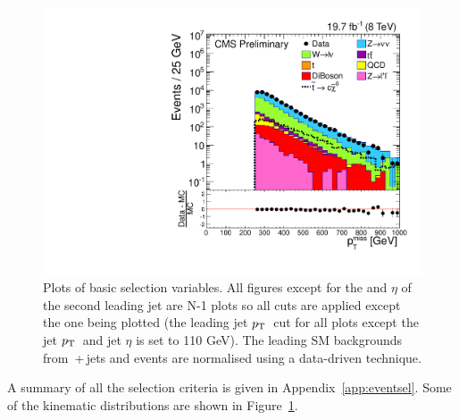 \begin{figure}
\begin{center}
   \includegraphics[scale=0.30]     {Figures/sus13009/cut/MetLep1.pdf}
   \caption{Plots of basic selection variables.  All figures except for the \pt and $\eta$ of the second leading jet are N-1 plots so all cuts are applied except the one being plotted (the leading jet $p_{\text{T}}\,$ cut for all plots except the jet $p_{\text{T}}\,$ and jet $\eta$ is set to 110 GeV). The leading SM backgrounds from \znunu\,+\,jets and \wpj events are normalised using a data-driven technique.%
         \label{fig:ANA_Jet_selection_plots}}
  \end{center}
\end{figure}
A summary of all the selection criteria is given in Appendix~\ref{app:eventsel}.
Some of the kinematic distributions are shown in Figure~\ref{fig:ANA_Jet_selection_plots}.


